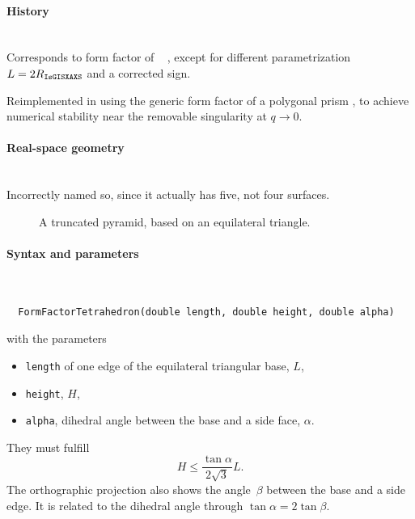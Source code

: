 \paragraph{History}\strut\\
Corresponds to  form factor of \IsGISAXS\
\cite[Eq.~2.31]{Laz06} \cite[Eq.~221]{ReLL09},
except for different parametrization $L=2R_{\rm{\texttt{IsGISXAXS}}}$
and a corrected sign.

Reimplemented in  using the generic form factor
of a polygonal prism \cite{Wut17},
to achieve numerical stability near the removable singularity at $q\to0$.


\ffsection{Tetrahedron} \label{STetrahedron}
\index{Tetrahedron}

\paragraph{Real-space geometry}\strut\\

\noindent
Incorrectly named so, since it actually has five, not four surfaces.

\begin{figure}[H]
\hfill
{}
\hfill
{}
\hfill
{}
\hfill
\caption{A truncated pyramid, based on an equilateral triangle.}
\end{figure}

\FloatBarrier

\paragraph{Syntax and parameters}\strut\\[-2ex plus .2ex minus .2ex]
\begin{lstlisting}
  FormFactorTetrahedron(double length, double height, double alpha)
\end{lstlisting}
with the parameters
\begin{itemize}
\item \texttt{length} of one edge of the equilateral triangular base, $L$,
\item \texttt{height}, $H$,
\item \texttt{alpha}, dihedral angle between the base and a side face, $\alpha$.
\end{itemize}
They must fulfill
\begin{displaymath}
  H\le \frac{\tan{\alpha}}{2\sqrt{3}} L.
\end{displaymath}
The orthographic projection also shows the angle~$\beta$ between the base and a side edge.
It is related to the dihedral angle through $\tan \alpha = 2 \tan \beta$.

